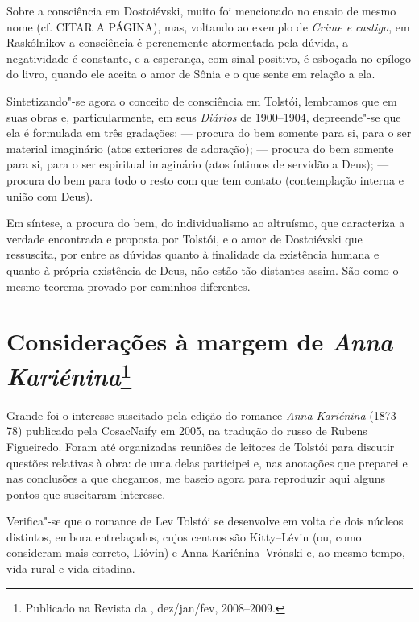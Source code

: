 Sobre a consciência em Dostoiévski, muito foi mencionado no
ensaio de mesmo nome (cf. CITAR A PÁGINA), mas, voltando ao
exemplo de \emph{Crime e castigo}, em Raskólnikov a consciência
é perenemente atormentada pela dúvida, a negatividade é constante,
e a esperança, com sinal positivo, é esboçada no epílogo do livro,
quando ele aceita o amor de Sônia e o que sente em relação a ela.

Sintetizando"-se agora o conceito de consciência em Tolstói, lembramos que em suas obras e, particularmente, em seus \emph{Diários} de 1900--1904, depreende"-se que ela é formulada em três gradações:  --- procura do bem somente para si, para o ser material imaginário (atos exteriores de adoração);  --- procura do bem somente para si, para o ser espiritual imaginário (atos íntimos de servidão a Deus);  --- procura do bem para todo o resto com que tem contato (contemplação interna e união com Deus).

Em síntese, a procura do bem, do individualismo ao altruísmo, que caracteriza a verdade encontrada e proposta por Tolstói, e o amor de Dostoiévski que ressuscita, por entre as dúvidas quanto à finalidade da existência humana e quanto à própria existência de Deus, não estão tão distantes assim. São como o mesmo teorema provado por caminhos diferentes.

\chapter{Considerações à margem de \emph{Anna Kariénina}\footnote{Publicado na Revista da {}, dez/jan/fev, 2008--2009.}}

Grande foi o interesse suscitado pela edição do romance \emph{Anna
Kariénina} (1873--78) publicado pela CosacNaify em 2005, na tradução do russo de Rubens Figueiredo. Foram até organizadas
reuniões de leitores de Tolstói para discutir questões relativas à
obra: de uma delas participei e, nas anotações que preparei e nas
conclusões a que chegamos, me baseio agora para reproduzir aqui alguns
pontos que suscitaram interesse.

Verifica"-se que o romance de Lev Tolstói se desenvolve em
volta de dois núcleos distintos, embora entrelaçados, cujos centros
são Kitty--Lévin (ou, como consideram mais correto, Lióvin) e Anna Kariénina--Vrónski e, ao mesmo tempo, vida
rural e vida citadina.

